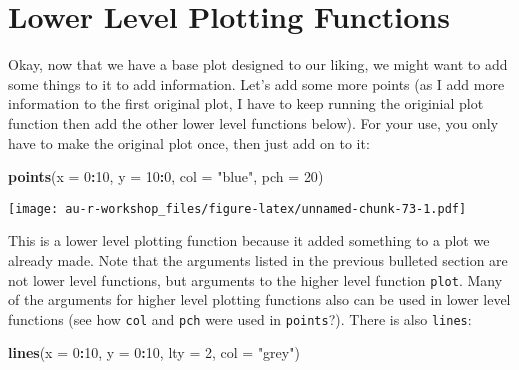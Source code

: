 \documentclass[]{book}
\newenvironment{Shaded}{\begin{snugshade}}{\end{snugshade}}
\newcommand{\KeywordTok}[1]{\textcolor[rgb]{0.13,0.29,0.53}{\textbf{#1}}}
\newcommand{\DataTypeTok}[1]{\textcolor[rgb]{0.13,0.29,0.53}{#1}}
\newcommand{\DecValTok}[1]{\textcolor[rgb]{0.00,0.00,0.81}{#1}}
\newcommand{\StringTok}[1]{\textcolor[rgb]{0.31,0.60,0.02}{#1}}
\newcommand{\OperatorTok}[1]{\textcolor[rgb]{0.81,0.36,0.00}{\textbf{#1}}}
\newcommand{\NormalTok}[1]{#1}
\theoremstyle{definition}
\theoremstyle{definition}
\theoremstyle{definition}
\theoremstyle{remark}
\begin{document}
\chapter{Lower Level Plotting
Functions}\label{lower-level-plotting-functions}

Okay, now that we have a base plot designed to our liking, we might want
to add some things to it to add information. Let's add some more points
(as I add more information to the first original plot, I have to keep
running the originial plot function then add the other lower level
functions below). For your use, you only have to make the original plot
once, then just add on to it:

\begin{Shaded}
\begin{Highlighting}[]
\KeywordTok{points}\NormalTok{(}\DataTypeTok{x =} \DecValTok{0}\OperatorTok{:}\DecValTok{10}\NormalTok{, }\DataTypeTok{y =} \DecValTok{10}\OperatorTok{:}\DecValTok{0}\NormalTok{, }\DataTypeTok{col =} \StringTok{"blue"}\NormalTok{, }\DataTypeTok{pch =} \DecValTok{20}\NormalTok{)}
\end{Highlighting}
\end{Shaded}

\texttt{[image: au-r-workshop\_files/figure-latex/unnamed-chunk-73-1.pdf]}

This is a lower level plotting function because it added something to a
plot we already made. Note that the arguments listed in the previous
bulleted section are not lower level functions, but arguments to the
higher level function \texttt{plot}. Many of the arguments for higher
level plotting functions also can be used in lower level functions (see
how \texttt{col} and \texttt{pch} were used in \texttt{points}?). There
is also \texttt{lines}:

\begin{Shaded}
\begin{Highlighting}[]
\KeywordTok{lines}\NormalTok{(}\DataTypeTok{x =} \DecValTok{0}\OperatorTok{:}\DecValTok{10}\NormalTok{, }\DataTypeTok{y =} \DecValTok{0}\OperatorTok{:}\DecValTok{10}\NormalTok{, }\DataTypeTok{lty =} \DecValTok{2}\NormalTok{, }\DataTypeTok{col =} \StringTok{"grey"}\NormalTok{)}
\end{Highlighting}
\end{Shaded}
\end{document}

